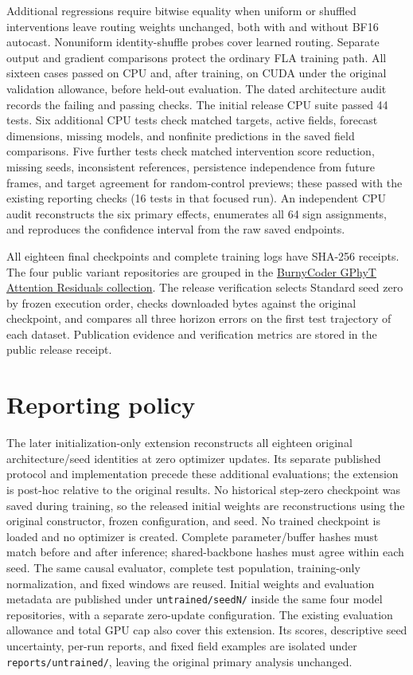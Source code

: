 Additional regressions require bitwise equality when uniform or shuffled interventions leave routing weights unchanged, both with and without BF16 autocast. Nonuniform identity-shuffle probes cover learned routing. Separate output and gradient comparisons protect the ordinary FLA training path. All sixteen cases passed on CPU and, after training, on CUDA under the original validation allowance, before held-out evaluation. The dated architecture audit records the failing and passing checks. The initial release CPU suite passed 44 tests. Six additional CPU tests check matched targets, active fields, forecast dimensions, missing models, and nonfinite predictions in the saved field comparisons. Five further tests check matched intervention score reduction, missing seeds, inconsistent references, persistence independence from future frames, and target agreement for random-control previews; these passed with the existing reporting checks (16 tests in that focused run). An independent CPU audit reconstructs the six primary effects, enumerates all 64 sign assignments, and reproduces the confidence interval from the raw saved endpoints\cite{studycode}.

All eighteen final checkpoints and complete training logs have SHA-256 receipts. The four public variant repositories are grouped in the \href{https://huggingface.co/collections/BurnyCoder/gphyt-attention-residuals-6adee5fe6ceb5f9ae1ccb873}{BurnyCoder GPhyT Attention Residuals collection}. The release verification selects Standard seed zero by frozen execution order, checks downloaded bytes against the original checkpoint, and compares all three horizon errors on the first test trajectory of each dataset. Publication evidence and verification metrics are stored in the public release receipt.

\section{Reporting policy}
The later initialization-only extension reconstructs all eighteen original architecture/seed identities at zero optimizer updates. Its separate published protocol and implementation precede these additional evaluations; the extension is post-hoc relative to the original results. No historical step-zero checkpoint was saved during training, so the released initial weights are reconstructions using the original constructor, frozen configuration, and seed. No trained checkpoint is loaded and no optimizer is created. Complete parameter/buffer hashes must match before and after inference; shared-backbone hashes must agree within each seed. The same causal evaluator, complete test population, training-only normalization, and fixed windows are reused. Initial weights and evaluation metadata are published under \texttt{untrained/seedN/} inside the same four model repositories, with a separate zero-update configuration. The existing evaluation allowance and total GPU cap also cover this extension. Its scores, descriptive seed uncertainty, per-run reports, and fixed field examples are isolated under \texttt{reports/untrained/}, leaving the original primary analysis unchanged\cite{studycode}.

